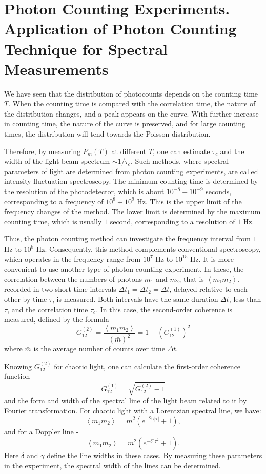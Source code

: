 \section{Photon Counting Experiments. Application of Photon Counting Technique for Spectral Measurements}

We have seen that the distribution of photocounts depends on the counting time $T$. When the counting time is compared with the correlation time, the nature of the distribution changes, and a peak appears on the curve. With further increase in counting time, the nature of the curve is preserved, and for large counting times, the distribution will tend towards the Poisson distribution. 

Therefore, by measuring $P_m\left(T\right)$ at different $T$, one can estimate $\tau_c$ and the width of the light beam spectrum $\sim 1/\tau_c$. Such methods, where spectral parameters of light are determined from photon counting experiments, are called intensity fluctuation spectroscopy. The minimum counting time is determined by the resolution of the photodetector, which is about $10^{-8} - 10^{-9}$ seconds, corresponding to a frequency of $10^{8}\div 10^{9}$ Hz. This is the upper limit of the frequency changes of the method. The lower limit is determined by the maximum counting time, which is usually $1$ second, corresponding to a resolution of $1$ Hz.

Thus, the photon counting method can investigate the frequency interval from $1$ Hz to $10^8$ Hz. Consequently, this method complements conventional spectroscopy, which operates in the frequency range from $10^7$ Hz to $10^{15}$ Hz. It is more convenient to use another type of photon counting experiment. In these, the correlation between the numbers of photons $m_1$ and $m_2$, that is $\left<m_1 m_2\right>$, recorded in two short time intervals $\Delta t_1 = \Delta t_2 = \Delta t$, delayed relative to each other by time $\tau$, is measured. Both intervals have the same duration $\Delta t$, less than $\tau$, and the correlation time $\tau_c$. In this case, the second-order coherence is measured, defined by the formula 
\[
G_{12}^{(2)} = \frac{\left<m_1 m_2\right>}{\left(\bar{m}\right)^2} = 
1 + \left(G_{12}^{(1)}\right)^2
\]
where $\bar{m}$ is the average number of counts over time $\Delta t$.

Knowing $G_{12}^{(2)}$ for chaotic light, one can calculate the first-order coherence function
\[
G_{12}^{(1)} = \sqrt{G_{12}^{(2)} - 1}
\]
and the form and width of the spectral line of the light beam related to it by Fourier transformation. For chaotic light with a Lorentzian spectral line, we have:
\begin{equation}
\left<m_1 m_2\right> = \bar{m}^2\left(e^{-2 \gamma \left|\tau\right|}
+ 1\right),
\label{eqCh4_68}
\end{equation}
and for a Doppler line -
\begin{equation}
\left<m_1 m_2\right> = \bar{m}^2\left(e^{-\delta^2 \tau^2}
+ 1\right).
\label{eqCh4_69}
\end{equation}
Here $\delta$ and $\gamma$ define the line widths in these cases. By measuring these parameters in the experiment, the spectral width of the lines can be determined.